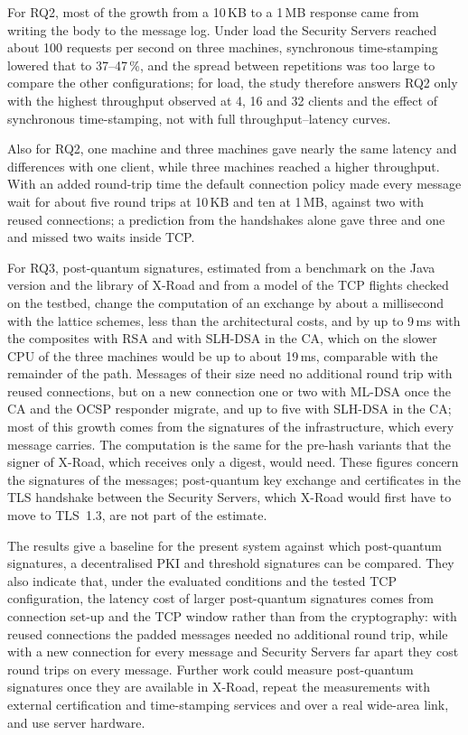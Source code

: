 \documentclass[conference,a4paper]{IEEEtran}
\newcommand{\newtext}[1]{{\color{blue}#1}}
\begin{document}
For RQ2, most of the growth from a 10\,KB to a 1\,MB response came from writing the body to the
message log. Under load the Security Servers reached about 100 requests per second on three machines,
synchronous time-stamping \newtext{lowered that to 37--47\,\%}, and the spread between repetitions was too large to compare
the other configurations\newtext{; for load, the study therefore answers RQ2 only with the highest
throughput observed at 4, 16 and 32 clients and the effect of synchronous time-stamping, not with
full throughput--latency curves}.

\newtext{Also for RQ2}, one machine and three machines gave nearly the same latency and differences with one
client, while three machines reached a higher throughput. With an added round-trip time the default
connection policy made every message wait for about five round trips at 10\,KB and ten at 1\,MB,
against two with reused connections; a prediction from the handshakes alone gave three and one and
missed two waits inside TCP.

\newtext{For RQ3, post-quantum signatures, estimated from a benchmark on the Java version and the
library of X-Road and from a model of the TCP flights checked on the testbed, change the computation
of an exchange by about a millisecond with the lattice schemes, less than the architectural costs,
and by up to 9\,ms with the composites with RSA and with SLH-DSA in the CA\newtext{, which on the
slower CPU of the three machines would be up to about 19\,ms, comparable with the remainder of the
path}. Messages of their size
need no additional round trip with reused connections, but on a new connection one or two with ML-DSA
once the CA and the OCSP responder migrate, and up to five with SLH-DSA in the CA; most of this growth comes from the
signatures of the infrastructure, which every message carries.} \newtext{The computation is the
same for the pre-hash variants that the signer of X-Road, which receives only a digest, would
need.} \newtext{These figures concern the
signatures of the messages; post-quantum key exchange and certificates in the TLS handshake between
the Security Servers, which X-Road would first have to move to TLS~1.3, are not part of the
estimate.}

The results give a baseline for the present system against which post-quantum signatures, a
decentralised PKI and threshold signatures can be compared. \newtext{They also indicate that, under
the evaluated conditions and the tested TCP configuration, the latency cost of larger post-quantum
signatures comes from connection set-up and the TCP window rather than from the cryptography: with
reused connections the padded messages needed no additional round trip, while with a new connection
for every message and Security Servers far apart they cost round trips on every message.} Further work could measure post-quantum
signatures once they are available in X-Road, repeat the measurements with external certification and
time-stamping services and over a real wide-area link, and use server hardware.
\end{document}
